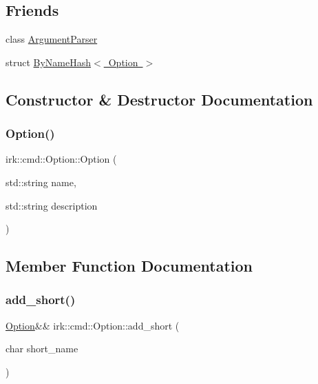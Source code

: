 \subsection*{Friends}
\begin{DoxyCompactItemize}
\item 
class \mbox{\hyperlink{classirk_1_1cmd_1_1Option_a55c9e1ac006a645af402e3aee6b64e00}{Argument\+Parser}}
\item 
struct \mbox{\hyperlink{classirk_1_1cmd_1_1Option_a0066c7e9ad41107a46c66ace788ced49}{By\+Name\+Hash$<$ Option $>$}}
\end{DoxyCompactItemize}


\subsection{Constructor \& Destructor Documentation}
\mbox{\label{classirk_1_1cmd_1_1Option_ad958f3683346fd37a72ac83431943657}} 
\subsubsection{\texorpdfstring{Option()}{Option()}}
{\footnotesize\ttfamily irk\+::cmd\+::\+Option\+::\+Option (\begin{DoxyParamCaption}\item[{std\+::string}]{name,  }\item[{std\+::string}]{description }\end{DoxyParamCaption})\hspace{0.3cm}{\ttfamily [inline]}}



\subsection{Member Function Documentation}
\mbox{\label{classirk_1_1cmd_1_1Option_aacea430a107430663a0aa6c51f8c986d}} 
\subsubsection{\texorpdfstring{add\+\_\+short()}{add\_short()}}
{\footnotesize\ttfamily \mbox{\hyperlink{classirk_1_1cmd_1_1Option}{Option}}\&\& irk\+::cmd\+::\+Option\+::add\+\_\+short (\begin{DoxyParamCaption}\item[{char}]{short\+\_\+name }\end{DoxyParamCaption})\hspace{0.3cm}{\ttfamily [inline]}}

